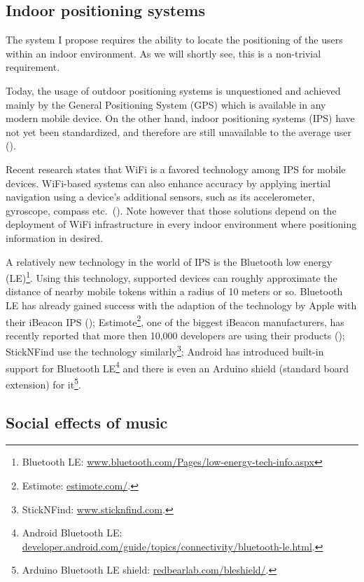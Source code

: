 \documentclass[a4paper,11pt]{article}
\begin{document}
\subsection{Indoor positioning systems} \label{literature:ips}

The system I propose requires the ability to locate the positioning of the users within an indoor environment.
As we will shortly see, this is a non-trivial requirement.

Today, the usage of outdoor positioning systems is unquestioned and achieved mainly by the General Positioning System (GPS) which is available in any modern mobile device.
On the other hand, indoor positioning systems (IPS) have not yet been standardized, and therefore are still unavailable to the average user (\cite{web:turetsky}).

Recent research states that WiFi is a favored technology among IPS for mobile devices.
WiFi-based systems can also enhance accuracy by applying inertial navigation using a device's additional sensors, such as its accelerometer, gyroscope, compass etc.\ (\cite{web:harrop}).
Note however that those solutions depend on the deployment of WiFi infrastructure in every indoor environment where positioning information in desired.

A relatively new technology in the world of IPS is the Bluetooth low energy (LE)\footnote{Bluetooth LE: \href{http://www.bluetooth.com/Pages/low-energy-tech-info.aspx}{www.bluetooth.com/Pages/low-energy-tech-info.aspx}}.
Using this technology, supported devices can roughly approximate the distance of nearby mobile tokens within a radius of 10 meters or so.
Bluetooth LE has already gained success with the adaption of the technology by Apple with their iBeacon IPS (\cite{web:danova});
Estimote\footnote{Estimote: \href{http://estimote.com/}{estimote.com/}.}, one of the biggest iBeacon manufacturers, has recently reported that more then 10,000 developers are using their products (\cite{web:thompson});
StickNFind use the technology similarly\footnote{StickNFind: \href{https://www.sticknfind.com}{www.sticknfind.com}.};
Android has introduced built-in support for Bluetooth LE\footnote{Android Bluetooth LE: \href{http://developer.android.com/guide/topics/connectivity/bluetooth-le.html}{developer.android.com/guide/topics/connectivity/bluetooth-le.html}.} and there is even an Arduino shield (standard board extension) for it\footnote{Arduino Bluetooth LE shield: \href{http://redbearlab.com/bleshield/}{redbearlab.com/bleshield/}.}.

\subsection{Social effects of music} \label{literature:social_effects}
\end{document}
